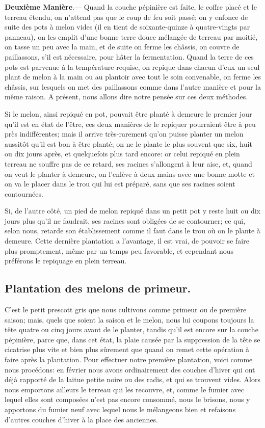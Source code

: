 \documentclass[10pt,a4paper]{book}
\begin{document}
\textbf{Deuxième Manière}.--- Quand la couche pépinière est faite, le coffre placé et le terreau étendu, on n'attend pas que le coup de feu soit passé; on y enfonce de suite des pots à melon vides (il en tient de soixante-quinze à quatre-vingts par panneau), on les emplit d'une bonne terre douce mélangée de terreau par moitié, on tasse un peu avec la main, et de suite on ferme les châssis, on couvre de paillassons, s'il est nécessaire, pour hâter la fermentation. Quand la terre de ces pots est parvenue à la température requise, on repique dans chacun d'eux un seul plant de melon à la main ou au plantoir avec tout le soin convenable, on ferme les châssis, sur lesquels on met des paillassons comme dans l'autre manière et pour la même raison. A présent, nous allons dire notre pensée sur ces deux méthodes.

Si le melon, ainsi repiqué en pot, pouvait être planté à demeure le premier jour qu'il est en état de l'être, ces deux manières de le repiquer pourraient être à peu près indifférentes; mais il arrive très-rarement qu'on puisse planter un melon aussitôt qu'il est bon à être planté; on ne le plante le plus souvent que six, huit ou dix jours après, et quelquefois plus tard encore: or celui repiqué en plein terreau ne souffre pas de ce retard, ses racines s'allongent à leur aise, et, quand on veut le planter à demeure, on l'enlève à deux mains avec une bonne motte et on va le placer dans le trou qui lui est préparé, sans que ses racines soient contournées.

Si, de l'autre côté, un pied de melon repiqué dans un petit pot y reste huit ou dix jours plus qu'il ne faudrait, ses racines sont obligées de se contourner; ce qui, selon nous, retarde son établissement comme il faut dans le trou où on le plante à demeure. Cette dernière plantation a l'avantage, il est vrai, de pouvoir se faire plus promptement, même par un temps peu favorable, et cependant nous préférons le repiquage en plein terreau.

\subsection{Plantation des melons de primeur.}

C'est le petit prescott\label{plantationpetitprescott}  gris que nous cultivons comme primeur ou de première saison; mais, quels que soient la saison et le melon, nous lui coupons toujours la tête quatre ou cinq jours avant de le planter, tandis qu'il est encore sur la couche pépinière, parce que, dans cet état, la plaie causée par la suppression de la tête se cicatrise plus vite et bien plus sûrement que quand on remet cette opération à faire après la plantation. Pour effectuer notre première plantation, voici comme nous procédons: en février nous avons ordinairement des couches d'hiver qui ont déjà rapporté de la laitue petite noire ou des radis, et qui se trouvent vides. Alors nous emportons ailleurs le terreau qui les recouvre, et, comme le fumier avec lequel elles sont composées n'est pas encore consommé, nous le brisons, nous y apportons du fumier neuf avec lequel nous le mélangeons bien et refaisons d'autres couches d'hiver à la place des anciennes.
\end{document}
